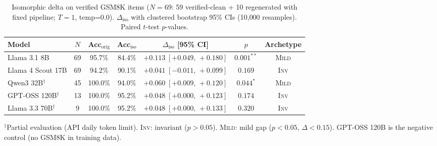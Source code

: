 \begin{table}[t]
\centering
\small
\caption{Isomorphic delta on verified GSM8K items ($N=69$: 59 verified-clean + 10 regenerated with fixed pipeline; $T=1$, temp=0.0). $\Delta_{\mathrm{iso}}$ with clustered bootstrap 95\% CIs (10{,}000 resamples). Paired $t$-test $p$-values.}
\label{tab:main}
\begin{tabular}{lcccccc}
\toprule
Model & $N$ & Acc$_{\mathrm{orig}}$ & Acc$_{\mathrm{iso}}$ & $\Delta_{\mathrm{iso}}$ [95\% CI] & $p$ & Archetype \\
\midrule
Llama 3.1 8B & 69 & 95.7\% & 84.4\% & $+0.113\;[+0.049,\,+0.180]$ & $0.001^{**}$ & \textsc{Mild} \\
Llama 4 Scout 17B & 69 & 94.2\% & 90.1\% & $+0.041\;[-0.011,\,+0.099]$ & $0.169$ & \textsc{Inv} \\
Qwen3 32B$^\dagger$ & 45 & 100.0\% & 94.0\% & $+0.060\;[+0.009,\,+0.120]$ & $0.044^{*}$ & \textsc{Mild} \\
GPT-OSS 120B$^\dagger$ & 13 & 100.0\% & 95.2\% & $+0.048\;[+0.000,\,+0.123]$ & $0.174$ & \textsc{Inv} \\
Llama 3.3 70B$^\dagger$ & 9 & 100.0\% & 95.2\% & $+0.048\;[+0.000,\,+0.133]$ & $0.320$ & \textsc{Inv} \\
\bottomrule
\end{tabular}
\vspace{1mm}
{\footnotesize $^\dagger$Partial evaluation (API daily token limit). \textsc{Inv}: invariant ($p > 0.05$). \textsc{Mild}: mild gap ($p < 0.05$, $\Delta < 0.15$). GPT-OSS 120B is the negative control (no GSM8K in training data).}
\end{table}
